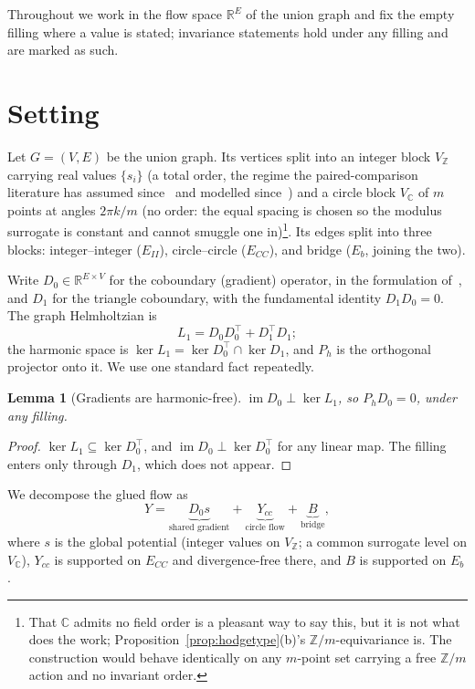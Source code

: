 \documentclass[11pt,a4paper]{article}
\newtheorem{lemma}{Lemma}
\theoremstyle{definition}
\theoremstyle{remark}
\newcommand{\R}{\mathbb{R}}
\newcommand{\C}{\mathbb{C}}
\newcommand{\Z}{\mathbb{Z}}
\newcommand{\im}{\operatorname{im}}
\newcommand{\Ph}{P_h}
\begin{document}
Throughout we work in the flow space $\R^E$ of the union graph and fix the empty filling where a value is stated; invariance statements hold under any filling and are marked as such.

\section{Setting}

Let $G=(V,E)$ be the union graph. Its vertices split into an integer block $V_{\Z}$ carrying real values $\{s_i\}$ (a total order, the
regime the paired-comparison literature has assumed since~\cite{kendall1940} and
modelled since~\cite{bradley1952}) and a circle block $V_{\C}$ of $m$ points at angles $2\pi k/m$ (no order: the equal spacing is chosen so the modulus surrogate is constant and cannot smuggle one in)\footnote{That $\C$ admits no field order is a pleasant way to say this, but it is not what does the work; Proposition~\ref{prop:hodgetype}(b)'s $\Z/m$-equivariance is. The construction would behave identically on any $m$-point set carrying a free $\Z/m$ action and no invariant order.}. Its edges split into three blocks: integer--integer ($E_{II}$), circle--circle ($E_{CC}$), and bridge ($E_b$, joining the two).

Write $D_0\in\R^{E\times V}$ for the coboundary (gradient) operator, in the
formulation of~\cite{jiang2011}, and $D_1$ for the triangle coboundary, with the fundamental identity $D_1D_0=0$. The graph Helmholtzian is
\[
L_1=D_0D_0^{\top}+D_1^{\top}D_1;
\]
the harmonic space is $\ker L_1=\ker D_0^{\top}\cap\ker D_1$, and $\Ph$ is the orthogonal projector onto it. We use one standard fact repeatedly.

\begin{lemma}[Gradients are harmonic-free]\label{lem:gradfree}
$\im D_0\perp\ker L_1$, so $\Ph D_0=0$, under any filling.
\end{lemma}
\begin{proof}
$\ker L_1\subseteq\ker D_0^{\top}$, and $\im D_0\perp\ker D_0^{\top}$ for any linear map. The filling enters only through $D_1$, which does not appear.
\end{proof}

We decompose the glued flow as
\begin{equation}
Y=
\underbrace{D_0s}_{\text{shared gradient}}
+
\underbrace{Y_{cc}}_{\text{circle flow}}
+
\underbrace{B}_{\text{bridge}},
\label{eq:glue}
\end{equation}
where $s$ is the global potential (integer values on $V_{\Z}$; a common surrogate level on $V_{\C}$), $Y_{cc}$ is supported on $E_{CC}$ and divergence-free there, and $B$ is supported on $E_b$.
\end{document}
